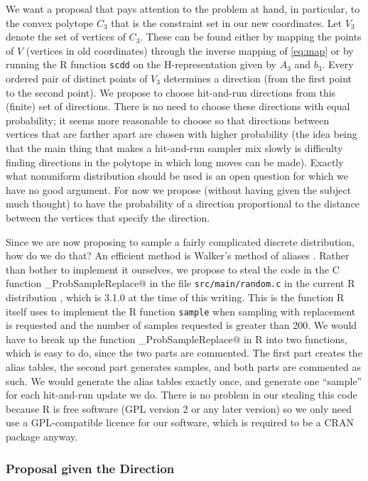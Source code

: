 \documentclass[11pt]{article}
\begin{document}
We want a proposal that pays attention to the problem at hand, in particular,
to the convex polytope $C_3$ that is the constraint set in our new coordinates.
Let $V_3$ denote the set of vertices of $C_3$.  These can be found either
by mapping the points of $V$ (vertices in old coordinates) through the
inverse mapping of \eqref{eq:map} or by running the R function \texttt{scdd}
on the H-representation given by $A_3$ and $b_3$.  Every ordered pair of
distinct points of $V_3$ determines a direction (from the first point to the
second point).  We propose to choose hit-and-run directions from this
(finite) set of directions.  There is no need to choose these directions
with equal probability; it seems more reasonable to choose so that directions
between vertices that are farther apart are chosen with higher probability
(the idea being that the main thing that makes a hit-and-run sampler mix
slowly is difficulty finding directions in the polytope in which long moves
can be made).  Exactly what nonuniform distribution should be used is an
open question for which we have no good argument.  For now we propose
(without having given the subject much thought) to have the probability
of a direction proportional to the distance between the vertices that
specify the direction.

Since we are now proposing to sample a fairly complicated discrete
distribution, how do we do that?  An efficient method is Walker's method
of aliases \citep{walker}.  Rather than bother to implement it ourselves,
we propose to steal the code
in the C function \verb@walker_ProbSampleReplace@ in the file
\texttt{src/main/random.c} in the current R distribution \citep{r},
which is 3.1.0 at the time of this writing.  This is the function R
itself uses to implement the R function \texttt{sample} when sampling
with replacement is requested and the number of samples requested
is greater than 200.  We would have to break up the function
\verb@walker_ProbSampleReplace@ in R into two functions, which is
easy to do, since the two parts are commented.  The first part creates
the alias tables, the second part generates samples, and both parts
are commented as such.  We would generate the alias tables exactly once,
and generate one ``sample'' for each hit-and-run update we do.
There is no problem in our stealing this code because R is free software
(GPL version 2 or any later version) so we only need use a GPL-compatible
licence for our software, which is required to be a CRAN package anyway.

\subsubsection{Proposal given the Direction} \label{sec:proposal-uniform}
\end{document}
